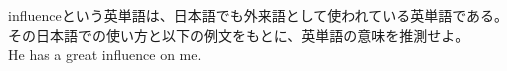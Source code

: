 \documentclass{jarticle}
\begin{document}
\vspace*{\fill}
\begin{center}
influenceという英単語は、日本語でも外来語として使われている英単語である。\\
その日本語での使い方と以下の例文をもとに、英単語の意味を推測せよ。\\
He has a great influence on me.
\end{center}
\vspace*{\fill}
\end{document}
